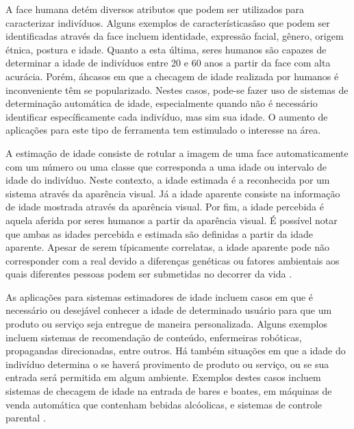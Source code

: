 
A face humana detém diversos atributos que podem ser utilizados para caracterizar indivíduos. Alguns exemplos de característicasãso que podem ser identificadas através da face incluem identidade, expressão facial, gênero, origem étnica, postura e idade. Quanto a esta última, seres humanos são capazes de determinar a idade de indivíduos entre 20 e 60 anos a partir da face com alta acurácia. Porém, áhcasos em que a checagem de idade realizada por humanos é inconveniente têm se popularizado. Nestes casos, pode-se fazer uso de sistemas de determinação automática de idade, especialmente quando não é necessário identificar específicamente cada indivíduo, mas sim sua idade. O aumento de aplicações para este tipo de ferramenta tem estimulado o interesse na área.

A estimação de idade consiste de rotular a imagem de uma face automaticamente com um número ou uma classe que corresponda a uma idade ou intervalo de idade do indivíduo. Neste contexto, a idade estimada é a reconhecida por um sistema através da aparência visual. Já a idade aparente consiste na informação de idade mostrada através da aparência visual. Por fim, a idade percebida é aquela aferida por seres humanos a partir da aparência visual. É possível notar que ambas as idades percebida e estimada são definidas a partir da idade aparente. Apesar de serem típicamente correlatas, a idade aparente pode não corresponder com a real devido a diferenças genéticas ou fatores ambientais aos quais diferentes pessoas podem ser submetidas no decorrer da vida \cite{fu2010age}.

As aplicações para sistemas estimadores de idade incluem casos em que é necessário ou desejável conhecer a idade de determinado usuário para que um produto ou serviço seja entregue de maneira personalizada. Alguns exemplos incluem sistemas de recomendação de conteúdo, enfermeiras robóticas, propagandas direcionadas, entre outros. Há também situações em que a idade do indivíduo determina o se haverá provimento de produto ou serviço, ou se sua entrada será permitida em algum ambiente. Exemplos destes casos incluem sistemas de checagem de idade na entrada de bares e boates, em máquinas de venda automática que contenham bebidas alcóolicas, e sistemas de controle parental \cite{fu2010age}.

